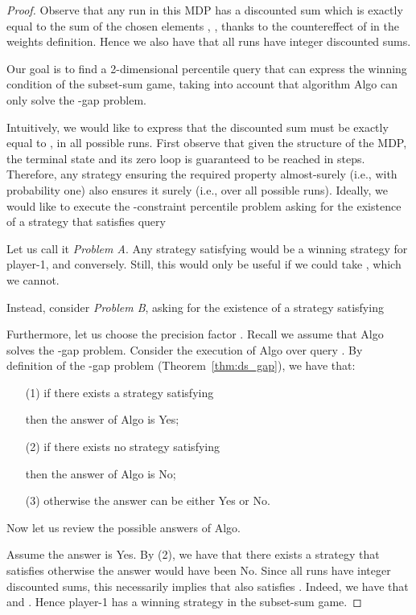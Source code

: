 \documentclass{llncs}
\begin{document}
\begin{proof}
Observe that any run in this MDP has a discounted sum which is exactly equal to the sum of the chosen elements , , thanks to the countereffect of  in the weights definition. Hence we also have that all runs have integer discounted sums. 

Our goal is to find a 2-dimensional percentile query that can express the winning condition of the subset-sum game, taking into account that algorithm \textsf{Algo} can only solve the -gap problem. 

Intuitively, we would like to express that the discounted sum must be exactly equal to , in all possible runs. First observe that given the structure of the MDP, the terminal state and its zero loop is guaranteed to be reached in  steps. Therefore, any strategy ensuring the required property almost-surely (i.e., with probability one) also ensures it surely (i.e., over all possible runs). Ideally, we would like to execute the -constraint percentile problem asking for the existence of a strategy that satisfies query

Let us call it \textit{Problem A}. Any strategy satisfying  would be a winning strategy for player-1, and conversely. Still, this would only be useful if we could take , which we cannot.

Instead, consider \textit{Problem B}, asking for the existence of a strategy satisfying

Furthermore, let us choose the precision factor . Recall we assume that \textsf{Algo} solves the -gap problem. Consider the execution of \textsf{Algo} over query . By definition of the -gap problem (Theorem~\ref{thm:ds_gap}), we have that:
\begin{itemize}
\item[(1)] if there exists a strategy  satisfying

then the answer of \textsf{Algo} is \textsf{Yes};
\item[(2)] if there exists no strategy  satisfying

then the answer of \textsf{Algo} is \textsf{No};
\item[(3)] otherwise the answer can be either \textsf{Yes} or \textsf{No}.
\end{itemize}
Now let us review the possible answers of \textsf{Algo}.

Assume the answer is \textsf{Yes}. By (2), we have that there exists a strategy  that satisfies  otherwise the answer would have been \textsf{No}. Since all runs have integer discounted sums, this necessarily implies that  also satisfies . Indeed, we have that  and . Hence player-1 has a winning strategy in the subset-sum game.


\end{proof}
\end{document}

